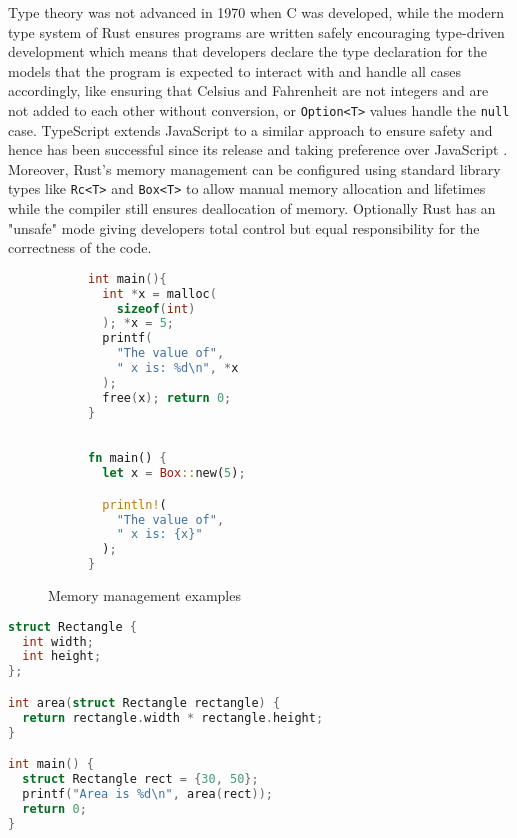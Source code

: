 \documentclass[10pt,a4paper,twocolumn]{article}
\begin{document}
Type theory was not advanced in 1970 when C was developed, while the modern type system of Rust ensures programs are written safely encouraging type-driven development which means that developers declare the type declaration for the models that the program is expected to interact with and handle all cases accordingly, like ensuring that Celsius and Fahrenheit are not integers and are not added to each other without conversion, or \texttt{Option<T>} values handle the \texttt{null} case. TypeScript extends JavaScript to a similar approach to ensure safety and hence has been successful since its release and taking preference over JavaScript \cite{10.1007/978-3-662-44202-9_11,TypeScri74}. Moreover, Rust's memory management can be configured using standard library types like \texttt{Rc<T>} and \texttt{Box<T>} to allow manual memory allocation and lifetimes while the compiler still ensures deallocation of memory. Optionally Rust has an "unsafe" mode giving developers total control but equal responsibility for the correctness of the code.

\begin{figure}[h]
    \centering
    \noindent\begin{subfigure}{.24\textwidth}
    \centering
    \begin{lstlisting}[language=C,caption={C}]
int main(){
  int *x = malloc(
    sizeof(int)
  ); *x = 5;
  printf(
    "The value of",
    " x is: %d\n", *x
  );
  free(x); return 0;
}
    \end{lstlisting}
    \end{subfigure}\hfill
    \begin{subfigure}{.24\textwidth}
    \centering
    \begin{lstlisting}[language=Rust,caption={Rust}]

fn main() {
  let x = Box::new(5);

  println!(
    "The value of",
    " x is: {x}"
  );
}

    \end{lstlisting}
    \end{subfigure}
    \caption{Memory management examples\\\vspace{1cm}}
\end{figure}

\begin{lstlisting}[language=C,caption={Type system in C}]
struct Rectangle {
  int width;
  int height;
};

int area(struct Rectangle rectangle) {
  return rectangle.width * rectangle.height;
}

int main() {
  struct Rectangle rect = {30, 50};
  printf("Area is %d\n", area(rect));
  return 0;
}
\end{lstlisting}
\end{document}
